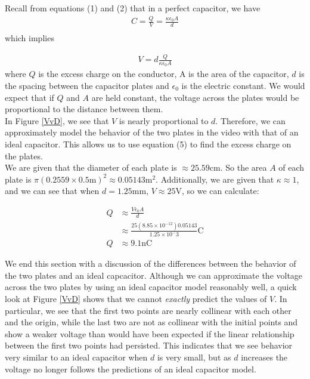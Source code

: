 \documentclass[oneside,12pt]{amsart}
\begin{document}
	\indent Recall from equations (1) and (2) that in a perfect capacitor, we have 
	\begin{align*}
	C = \frac{Q}{V} =  \frac{\kappa \epsilon _{0}A}{d}\\
	\end{align*}
	which implies
	
	\begin{align}
	V = d\frac{Q}{\kappa\epsilon_0A}
	\end{align}
	 where $Q$ is the excess charge on the conductor, A is the area of the capacitor, $d$ is the spacing between the capacitor plates and $\epsilon_0$ is the electric constant. We would expect that if $Q$ and $A$ are held constant, the voltage across the plates would be proportional to the distance between them.\\
	 
	 \indent In Figure \ref{VvD}, we see that $V$ is nearly proportional to $d$. Therefore, we can approximately model the behavior of the two plates in the video with that of an ideal capacitor. This allows us to use equation (5) to find the excess charge on the plates.\\
	 
	 \indent We are given that the diameter of each plate is $\approx 25.59$cm. So the area $A$ of each plate is $\pi(0.2559\times0.5\text{m})^2\approx 0.05143\text{m}^2$. Additionally, we are given that $\kappa \approx 1$, and we can see that when $d = 1.25$mm, $V \approx 25$V, so we can calculate:
	 
	 \begin{align*}
	 	Q&\approx \frac{V\epsilon_0A}{d}\\
	 	&\approx \frac{25 (8.85\times 10^{-12})0.05143}{1.25\times 10^-3}\text{C}\\
	 	Q&\approx 9.1\text{nC}	 	
	 \end{align*}
	 
	 \indent We end this section with a discussion of the differences between the behavior of the two plates and an ideal capcacitor. Although we can approximate the voltage across the two plates by using an ideal capacitor model reasonably well, a quick look at Figure \ref{VvD} shows that we cannot \textit{exactly} predict the values of $V$. In particular, we see that the first two points are nearly collinear with each other and the origin, while the last two are not as collinear with the initial points and show a weaker voltage than would have been expected if the linear relationship between the first two points had persisted. This indicates that we see behavior very similar to an ideal capacitor when $d$ is very small, but as $d$ increases the voltage no longer follows the predictions of an ideal capacitor model.\\
	 
\end{document}
